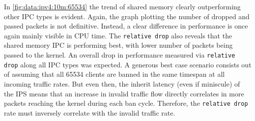 In \ref{fig:data:ipv4:10m:65534} the trend of shared memory clearly outperforming other IPC types is evident.
Again, the graph plotting the number of dropped and passed packets is not definitive.
Instead, a clear difference in performance is once again mainly visible in CPU time.
The \texttt{relative drop} also reveals that the shared memory IPC is performing best, with lower number of packets being passed to the kernel.
An overall drop in performance measured via \texttt{relative drop} along all IPC types was expected.
A generous best case scenario consists out of assuming that all 65534 clients are banned in the same timespan at all incoming traffic rates.
But even then, the inherit latency (even if miniscule) of the IPS means that an increase in invalid traffic flow directly correlates in more packets reaching the kernel during each ban cycle.
Therefore, the \texttt{relative drop} rate must inversely correlate with the invalid traffic rate.

